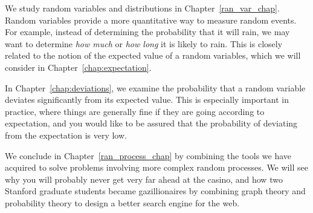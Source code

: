 We study random variables and distributions in
Chapter~\ref{ran_var_chap}.  Random variables provide a more
quantitative way to measure random events.  For example, instead of
determining the probability that it will rain, we may want to
determine \emph{how much} or \emph{how long} it is likely to rain.
This is closely related to the notion of the expected value of a
random variables, which we will consider in
Chapter~\ref{chap:expectation}.

In Chapter~\ref{chap:deviations}, we examine the probability that a
random variable deviates significantly from its expected value.  This
is especially important in practice, where things are generally fine
if they are going according to expectation, and you would like to be
assured that the probability of deviating from the expectation is very
low.

We conclude in Chapter~\ref{ran_process_chap} by combining the tools
we have acquired to solve problems involving more complex random
processes.  We will see why you will probably never get very far ahead
at the casino, and how two Stanford graduate students became
gazillionaires by combining graph theory and probability theory to
design a better search engine for the web.

\endinput

